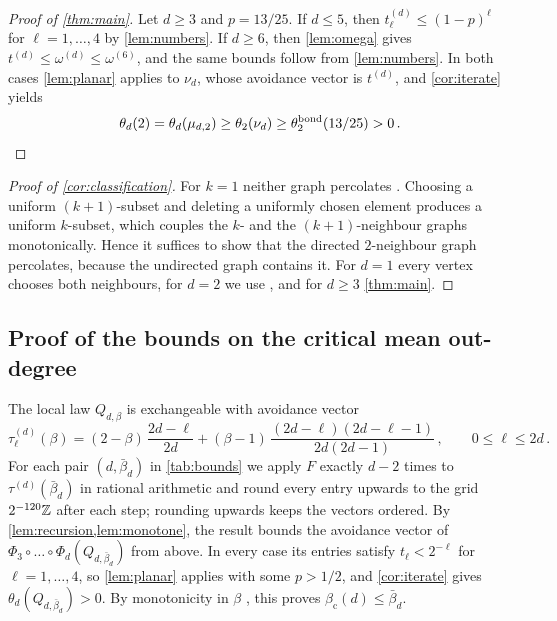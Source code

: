 \documentclass[11pt,letterpaper]{article}
\begin{document}
\begin{proof}[Proof of \cref{thm:main}]
Let $d\ge3$ and $p=13/25$. If $d\le5$, then $t^{(d)}_\ell\le(1-p)^\ell$ for $\ell=1,\dots,4$ by \cref{lem:numbers}. If $d\ge6$, then \cref{lem:omega} gives $t^{(d)}\le\omega^{(d)}\le\omega^{(6)}$, and the same bounds follow from \cref{lem:numbers}. In both cases \cref{lem:planar} applies to $\nu_d$, whose avoidance vector is $t^{(d)}$, and \cref{cor:iterate} yields
\begin{equation*}
\theta_d(2)=\theta_d(\mu_{d,2})\ge\theta_2(\nu_d)\ge\theta^{\mathrm{bond}}_2(13/25)>0\,.\qedhere
\end{equation*}
\end{proof}

\begin{proof}[Proof of \cref{cor:classification}]
For $k=1$ neither graph percolates \cite[Propositions~2.1 and~2.5]{JKLT25}. Choosing a uniform $(k+1)$-subset and deleting a uniformly chosen element produces a uniform $k$-subset, which couples the $k$- and the $(k+1)$-neighbour graphs monotonically. Hence it suffices to show that the directed $2$-neighbour graph percolates, because the undirected graph contains it. For $d=1$ every vertex chooses both neighbours, for $d=2$ we use \cite[Theorem~2.3]{CHJK26}, and for $d\ge3$ \cref{thm:main}.
\end{proof}

\subsection{Proof of the bounds on the critical mean out-degree}\label{sec:proof-bounds}

The local law $Q_{d,\beta}$ is exchangeable with avoidance vector
\begin{equation*}
\tau^{(d)}_\ell(\beta)=(2-\beta)\,\frac{2d-\ell}{2d}+(\beta-1)\,\frac{(2d-\ell)(2d-\ell-1)}{2d(2d-1)}\,,\qquad0\le\ell\le2d\,.
\end{equation*}
For each pair $(d,\bar\beta_d)$ in \cref{tab:bounds} we apply $F$ exactly $d-2$ times to $\tau^{(d)}(\bar\beta_d)$ in rational arithmetic and round every entry upwards to the grid $2^{-120}\mathbb Z$ after each step; rounding upwards keeps the vectors ordered. By \cref{lem:recursion,lem:monotone}, the result bounds the avoidance vector of $\Phi_3\circ\dots\circ\Phi_d(Q_{d,\bar\beta_d})$ from above. In every case its entries satisfy $t_\ell<2^{-\ell}$ for $\ell=1,\dots,4$, so \cref{lem:planar} applies with some $p>1/2$, and \cref{cor:iterate} gives $\theta_d(Q_{d,\bar\beta_d})>0$. By monotonicity in $\beta$ \cite[Lemma~2.1]{CHJK26}, this proves $\beta_{\mathrm c}(d)\le\bar\beta_d$.
\end{document}
